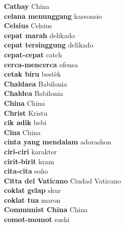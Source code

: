 \textbf{ Cathay  } China \\
\textbf{ celana menunggang  } karsonsio \\
\textbf{ Celsius  } Celsius \\
\textbf{ cepat marah  } delikado \\
\textbf{ cepat tersinggung  } delikado \\
\textbf{ cepat-cepat  } catch \\
\textbf{ cerca-mencerca  } ofensa \\
\textbf{ cetak biru  } bestèk \\
\textbf{ Chaldaea  } Babilonia \\
\textbf{ Chaldea  } Babilonia \\
\textbf{ China  } China \\
\textbf{ Christ  } Kristu \\
\textbf{ cik adik  } bebi \\
\textbf{ Cina  } China \\
\textbf{ cinta yang mendalam  } adorashon \\
\textbf{ ciri-ciri  } karakter \\
\textbf{ cirit-birit  } kram \\
\textbf{ cita-cita  } soño \\
\textbf{ Citta del Vaticano  } Ciudad Vaticano \\
\textbf{ coklat gelap  } skur \\
\textbf{ coklat tua  } maron \\
\textbf{ Communist China  } China \\
\textbf{ comot-momot  } sushi \\
